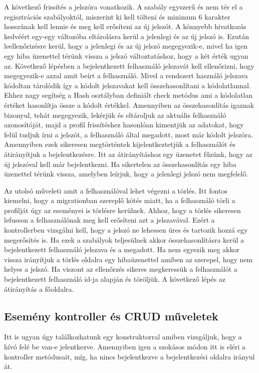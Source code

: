 \documentclass[
]{thesis-ekf}
\theoremstyle{definition}
\theoremstyle{remark}
\begin{document}
A következő frissítés a jelszóra vonatkozik. A szabály egyszerű és nem tér el a regisztrációs szabályoktól, miszerint ki kell tölteni és minimum 6 karakter hosszúnak kell lennie és meg kell erősíteni az új jelszót. A könnyebb hivatkozás kedvéért egy-egy változóba eltárolásra kerül a jelenlegi és az új jelszó is. Ezután leellenőrizésre kerül, hogy a jelenlegi és az új jelszó megegyezik-e, mivel ha igen egy hiba üzenettel térünk vissza a jelszó változtatáshoz, hogy a két érték ugyan az. Következő lépésben a bejelentkezett felhasználó jelszavát kell ellenőrizni, hogy megegyezik-e azzal amit beírt a felhasználó. Mivel a rendszert használó jelszava kódoltan tárolódik így a kódolt jelszavakat kell összehasonlítani a kódolatlannal. Ehhez nagy segítség a Hash osztályban definiált check metódus ami a kódolatlan értéket hasonlítja össze a kódolt értékkel. Amennyiben az összehasonlítás igaznak bizonyul, tehát megegyezik, lekérjük és eltároljuk az aktuális felhasználó azonosítóját, majd a profil frissítéshez hasonlóan kimentjük az adatokat, hogy felül tudjuk írni a jelszót, a felhasználó által megadott, most már kódolt jelszóra. Amennyiben ezek sikeresen megtörténtek kijelentkeztetjük a felhasználót és átirányítjuk a bejelentkezésre. Itt az átirányításhoz egy üzenetet fűzünk, hogy az új jelszóval kell már bejelentkezni. Ha sikertelen az összehasonlítás egy hiba üzenettel térünk vissza, amelyben leírjuk, hogy a jelenlegi jelszó nem megfelelő. 

Az utolsó műveleti amit a felhasználóval lehet végezni a törlés. Itt fontos kiemelni, hogy a migrationban szereplő kötés miatt, ha a felhasználó törli a profilját úgy az eseményei is törlésre kerülnek. Ahhoz, hogy a törlés sikeresen lefusson a felhasználónak meg kell erősíteni azt a jelszavával. Ezért a kontrollerben vizsgálni kell, hogy a jelszó ne lehessen üres és tartozik hozzá egy megerősítés is. Ha ezek a szabályok teljesülnek akkor összehasonlításra kerül a bejelentkezett felhasználó jelszava és a megadott. Ha nem egyezik meg akkor vissza irányítjuk a törlés oldalra egy hibaüzenettel amiben az szerepel, hogy nem helyes a jelszó. Ha viszont az ellenőrzés sikeres megkeressük a felhasználót a bejelentkezett felhasználó id-ja alapján és töröljük. A következő lépés az átirányítás a főoldalra.

\subsection{Esemény kontroller és CRUD műveletek}
Itt is ugyan úgy találkozhatunk egy konstruktorral amiben vizsgáljuk, hogy a hívó felé be van-e jelentkezve. Amennyiben igen a szokásos módon itt is eléri a kontroller metódusait, míg, ha nincs bejelentkezve a bejelentkezési oldalra irányul át.
\end{document}
